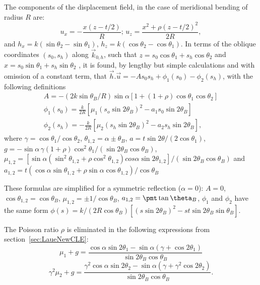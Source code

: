 \documentclass[preprint]{iucr}              %
\newcommand{\inred}[1]{{\color{red}#1}}
\begin{document}
The components of the displacement field, in the case of meridional bending of radius $R$ are:
\begin{equation}
    u_x = -\frac{x(z-t/2)}{R}; \, u_z=\frac{x^2+\rho(z-t/2)^2}{2R},
\end{equation}
and $h_x=k(\sin\theta_2-\sin\theta_1)$, \inred{$h_z=k(\cos\theta_2-\cos\theta_1)$}.
In terms of the oblique coordinates $(s_0,s_h)$ along $\vec k_{0,h}$, such that $z=s_0\cos\theta_1 + s_h \cos\theta_2$ and $x=s_0 \sin\theta_1+s_h\sin\theta_2$ , 
it is found, by lengthy but simple calculations and with omission of a constant term, that $\vec h.\vec u=-A s_0 s_h + \phi_1(s_0) -\phi_2(s_h)$,  
with the following definitions
\begin{multline}
    A = -(2 k \sin\theta_B /R)\sin\alpha[1+(1+\rho)\cos\theta_1\cos\theta_2] \\
    \phi_1(s_0) = \frac{k}{2R}[\mu_1(s_o\sin2\theta_B)^2-a_1 s_0\sin2\theta_B] \\
    \phi_2(s_h) = -\frac{k}{2R}[\mu_2(s_h\sin2\theta_B)^2-a_2 s_h\sin2\theta_B],
\end{multline}
where $\gamma=\cos\theta_1/\cos\theta_2$, $\theta_{1,2}=\alpha\pm \theta_B$, $a=t \sin2\theta / (2\cos\theta_1)$, 
$g=-\sin\alpha \, \gamma (1+\rho)\cos^2\theta_1/(\sin2\theta_B\cos\theta_B)$,
$\mu_{1,2}=[\sin\alpha(\sin^2\theta_{1,2}+\rho\cos^2\theta_{1,2})cos\alpha\sin2\theta_{1,2}]/(\sin2\theta_B\cos\theta_B)$ and
$a_{1,2}=t(\cos\alpha\sin\theta_{1,2}+\rho\sin\alpha\cos\theta_{1,2})/\cos\theta_B$ 


These formulas are simplified for a symmetric reflection ($\alpha=0$):
$A=0$, $\cos\theta_{1,2}=\cos\theta_B$, $\mu_{1,2}=\pm1/\cos\theta_B$, $a_{1,2}=\pmt\tan\theta_B$, $\phi_1$ and  $\phi_2$ have the same form $\phi(s)=k/(2R\cos\theta_B)[(s\sin2\theta_B)^2-s t \sin2\theta_B\sin\theta_B]$. 

The Poisson ratio $\rho$ is eliminated in the following expressions from section~\ref{sec:LaueNewCLE}: 
\begin{equation}
    \mu_1+g=\frac{\cos\alpha\sin2\theta_1-\sin\alpha(\gamma+\cos2\theta_1)}{\sin2\theta_B\cos\theta_B}
\end{equation}
\begin{equation}
    \gamma^2\mu_2+g=\frac{\gamma^2\cos\alpha\sin2\theta_2-\sin\alpha(\gamma+\gamma^2\cos2\theta_2)}{\sin2\theta_B\cos\theta_B}.
\end{equation}
\end{document}
